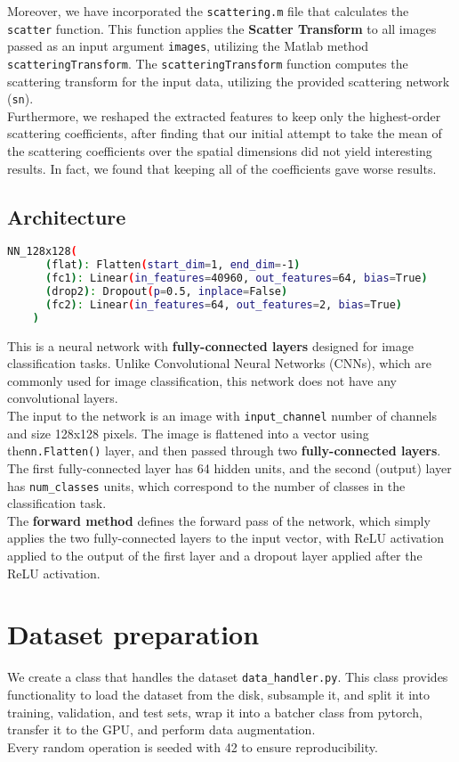 \documentclass{report}
\begin{document}
Moreover, we have incorporated the \texttt{scattering.m} file that calculates the \texttt{scatter} function. This function applies the \textbf{Scatter Transform} to all images passed as an input argument \texttt{images}, utilizing the Matlab method \texttt{scatteringTransform}. The \texttt{scatteringTransform} function computes the scattering transform for the input data, utilizing the provided scattering network (\texttt{sn}).\\
Furthermore, we reshaped the extracted features to keep only the highest-order scattering coefficients, after finding that our initial attempt to take the mean of the scattering coefficients over the spatial dimensions did not yield interesting results. In fact, we found that keeping all of the coefficients gave worse results.


\subsection{Architecture}
\begin{lstlisting}[language=bash]
    NN_128x128(
      (flat): Flatten(start_dim=1, end_dim=-1)
      (fc1): Linear(in_features=40960, out_features=64, bias=True)
      (drop2): Dropout(p=0.5, inplace=False)
      (fc2): Linear(in_features=64, out_features=2, bias=True)
    )
    \end{lstlisting}
    This is a neural network with \textbf{fully-connected layers} designed for image classification tasks. Unlike Convolutional Neural Networks (CNNs), which are commonly used for image classification, this network does not have any convolutional layers. \\
    The input to the network is an image with \texttt{input\_channel} number of channels and size 128x128 pixels. The image is flattened into a vector using the\texttt{nn.Flatten()} layer, and then passed through two \textbf{fully-connected layers}. The first fully-connected layer has 64 hidden units, and the second (output) layer has \texttt{num\_classes} units, which correspond to the number of classes in the classification task.\\
    
    The \textbf{forward method} defines the forward pass of the network, which simply applies the two fully-connected layers to the input vector, with ReLU activation applied to the output of the first layer and a dropout layer applied after the ReLU activation.

\section{Dataset preparation}
We create a class that handles the dataset \texttt{data\_handler.py}. This class provides functionality to load the dataset from the disk, subsample it, and split it 
into training, validation, and test sets, wrap it into a batcher class from pytorch, transfer it to the GPU, and perform data augmentation. \\
Every random operation is seeded with 42 to ensure reproducibility.\\
\end{document}
